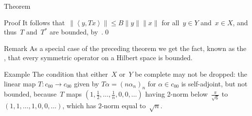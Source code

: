 \documentclass[a]{subfiles}
\begin{document}
\begin{parsec}
\begin{point}{Theorem}
\begin{point}{Proof}
It follows that~$\|\left<y,Tx\right>\|\leq B\|y\|\|x\|$
for all~$y\in Y$ and~$x\in X$,
and thus~$T$ and~$T^*$ are bounded, by~.\qed
\end{point}
\begin{point}{Remark}%
As a special case of the preceding theorem
we get the fact,
known as the ,%
that every symmetric
operator on a Hilbert space is bounded.
\end{point}
\begin{point}{Example}%
The condition that either~$X$ or~$Y$ be complete may not be dropped:
the linear map $T\colon c_{00}\to c_{00}$
given by $T\alpha = (n\alpha_n)_n$ for $\alpha\in c_{00}$
is self-adjoint,
but not bounded,
because~$T$ maps $(1,\frac{1}{2},\dotsc,\frac{1}{n},0,0,\dotsc)$
having 2-norm below~$\frac{\pi}{\sqrt{6}}$
to $(1,1,\dotsc,1,0,0,\dotsc)$,
which has $2$-norm equal to~$\sqrt{n}$.
\end{point}
\end{point}
\end{parsec}
\end{document}
